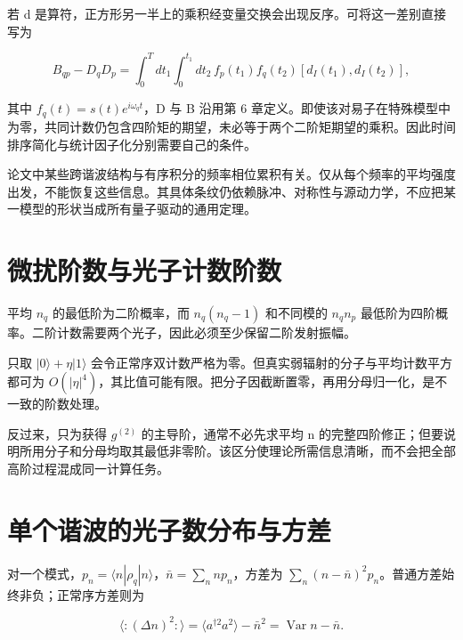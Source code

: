 \documentclass[UTF8,a4paper,zihao=-4,openany,fontset=fandol]{ctexbook}
\begin{document}
若 d 是算符，正方形另一半上的乘积经变量交换会出现反序。可将这一差别直接写为



\begin{equation*}
B_{qp}-D_qD_p
=\int_0^T dt_1\int_0^{t_1}dt_2\,
f_p(t_1)f_q(t_2)[d_I(t_1),d_I(t_2)],
\tag{8.1a}\label{eq:8.1a}
\end{equation*}


其中 $f_q(t)=s(t)e^{i\omega_qt}$，D 与 B 沿用第 6 章定义。即使该对易子在特殊模型中为零，共同计数仍包含四阶矩的期望，未必等于两个二阶矩期望的乘积。因此时间排序简化与统计因子化分别需要自己的条件。



论文中某些跨谐波结构与有序积分的频率相位累积有关。仅从每个频率的平均强度出发，不能恢复这些信息。其具体条纹仍依赖脉冲、对称性与源动力学，不应把某一模型的形状当成所有量子驱动的通用定理。



\section{微扰阶数与光子计数阶数}\label{sec:08:4}


平均 $n_q$ 的最低阶为二阶概率，而 $n_q(n_q-1)$ 和不同模的 $n_qn_p$ 最低阶为四阶概率。二阶计数需要两个光子，因此必须至少保留二阶发射振幅。



只取 $|0\rangle+\eta|1\rangle$ 会令正常序双计数严格为零。但真实弱辐射的分子与平均计数平方都可为 $O(|\eta|^4)$，其比值可能有限。把分子因截断置零，再用分母归一化，是不一致的阶数处理。



反过来，只为获得 $g^{(2)}$ 的主导阶，通常不必先求平均 n 的完整四阶修正；但要说明所用分子和分母均取其最低非零阶。该区分使理论所需信息清晰，而不会把全部高阶过程混成同一计算任务。



\section{单个谐波的光子数分布与方差}\label{sec:08:5}


对一个模式，$p_n=\langle n|\rho_q|n\rangle$，$\bar n=\sum_nnp_n$，方差为 $\sum_n(n-\bar n)^2p_n$。普通方差始终非负；正常序方差则为



\begin{equation*}
\langle:(\Delta n)^2:\rangle
=\langle a^{\dagger2}a^2\rangle-\bar n^2
=\operatorname{Var}n-\bar n.
\tag{8.2}\label{eq:8.2}
\end{equation*}
\end{document}
